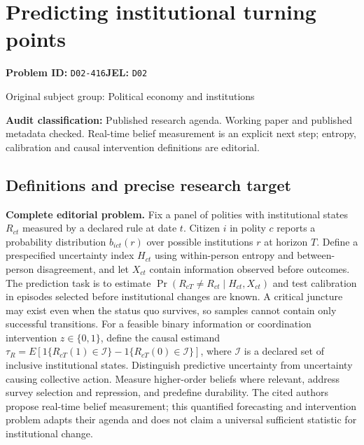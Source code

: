 \documentclass[11pt,a4paper]{article}
\begin{document}
\section*{Predicting institutional turning points}
\textbf{Problem ID:} \texttt{D02-416}\quad \textbf{JEL:} \texttt{D02}\par
\label{problem:OP-0380}
{\sffamily\small\color{muted}Original subject group: Political economy and institutions\par}
\label{definitions:problem:30007662}
\textbf{Audit classification:} Published research agenda. Working paper and published metadata checked. Real-time belief measurement is an explicit next step; entropy, calibration and causal intervention definitions are editorial.
\subsection*{Definitions and precise research target}
\textbf{Complete editorial problem.} Fix a panel of polities with institutional states \(R_{ct}\) measured by a declared rule at date \(t\). Citizen \(i\) in polity \(c\) reports a probability distribution \(b_{ict}(r)\) over possible institutions \(r\) at horizon \(T\). Define a prespecified uncertainty index \(H_{ct}\) using within-person entropy and between-person disagreement, and let \(X_{ct}\) contain information observed before outcomes. The prediction task is to estimate \(\Pr(R_{cT}\ne R_{ct}\mid H_{ct},X_{ct})\) and test calibration in episodes selected before institutional changes are known. A critical juncture may exist even when the status quo survives, so samples cannot contain only successful transitions. For a feasible binary information or coordination intervention \(z\in\{0,1\}\), define the causal estimand \(\tau_R=E[1\{R_{cT}(1)\in\mathcal I\}-1\{R_{cT}(0)\in\mathcal I\}]\), where \(\mathcal I\) is a declared set of inclusive institutional states. Distinguish predictive uncertainty from uncertainty causing collective action. Measure higher-order beliefs where relevant, address survey selection and repression, and predefine durability. The cited authors propose real-time belief measurement; this quantified forecasting and intervention problem adapts their agenda and does not claim a universal sufficient statistic for institutional change.
\end{document}
